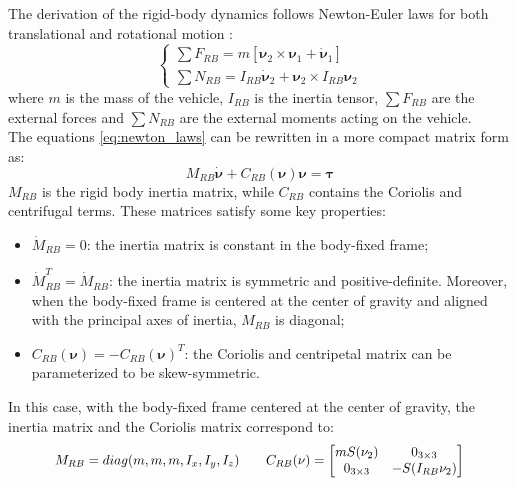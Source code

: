The derivation of the rigid-body dynamics follows Newton-Euler laws for both translational and rotational motion \cite{fossenHandbookMarineCraft2011}:
\begin{equation}
    \begin{cases}
        \sum F_{RB} = m[\mathbf{\nu}_2 \times \mathbf{\nu}_1 + \dot{\mathbf{\nu}}_1] \\
        \sum N_{RB} = I_{RB}\dot{\mathbf{\nu}}_2 + \mathbf{\nu}_2 \times I_{RB}\mathbf{\nu}_2
    \end{cases}
    \label{eq:newton_laws}
\end{equation}
where $m$ is the mass of the vehicle, $I_{RB}$ is the inertia tensor, $\sum F_{RB}$ are the external forces and $\sum N_{RB}$ are the external moments acting on the vehicle.\\
The equations \ref{eq:newton_laws} can be rewritten in a more compact matrix form as:
\begin{equation}
    M_{RB}\dot{\mathbf{\nu}} + C_{RB}(\mathbf{\nu})\mathbf{\nu} = \mathbf{\tau}
    \label{eq:6dof_dyn_simple}
\end{equation}
$M_{RB}$ is the rigid body inertia matrix, while $C_{RB}$ contains the Coriolis and centrifugal terms.
These matrices satisfy some key properties:
\begin{itemize}
    \item $\dot M_{RB} = 0$: the inertia matrix is constant in the body-fixed frame;
    \item $\dot M_{RB}^T = \dot M_{RB}$: the inertia matrix is symmetric and positive-definite. Moreover, when the body-fixed frame is centered at the 
    center of gravity and aligned with the principal axes of inertia, $M_{RB}$ is diagonal;
    \item $C_{RB}(\mathbf{\nu}) = -C_{RB}(\mathbf{\nu})^T$: the Coriolis and centripetal matrix can be parameterized to be skew-symmetric.
\end{itemize}
In this case, with the body-fixed frame centered at the center of gravity, the inertia matrix and the Coriolis matrix correspond to:
\begin{equation}
    \scalebox{0.95}{
        $ M_{RB} = diag(m, m, m, I_x, I_y, I_z) \qquad
        C_{RB}(\mathbf{\nu}) = \begin{bmatrix}
            mS(\mathbf{\nu}_2) & 0_{3 \times 3} \\
            0_{3 \times 3} & -S(I_{RB}\mathbf{\nu}_2)    
        \end{bmatrix} $
    }
    \label{eq:RB_matrices}
\end{equation}

